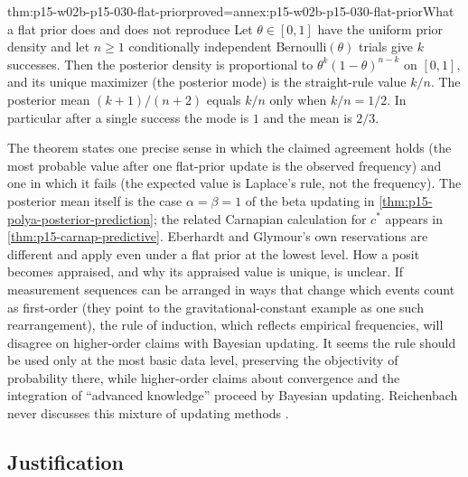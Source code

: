 \begin{hbtheorem}{thm:p15-w02b-p15-030-flat-prior}{proved=annex:p15-w02b-p15-030-flat-prior}{What a flat prior does and does not reproduce}
Let \(\theta\in[0,1]\) have the uniform prior density and let \(n\geq1\)
conditionally independent Bernoulli\((\theta)\) trials give \(k\)
successes. Then the posterior density is proportional to
\(\theta^k(1-\theta)^{n-k}\) on \([0,1]\), and its unique maximizer (the
posterior mode) is the straight-rule value \(k/n\). The posterior mean
\((k+1)/(n+2)\) equals \(k/n\) only when \(k/n=1/2\). In particular after
a single success the mode is \(1\) and the mean is \(2/3\).
\end{hbtheorem}

The theorem states one precise sense in which the claimed agreement
holds (the most probable value after one flat-prior update is the
observed frequency) and one in which it fails (the expected value is
Laplace's rule, not the frequency). The posterior mean itself is the case
\(\alpha=\beta=1\) of the beta updating in
\cref{thm:p15-polya-posterior-prediction}; the related Carnapian
calculation for \(c^*\) appears in \cref{thm:p15-carnap-predictive}. Eberhardt and Glymour's
own reservations are different and apply even under a flat prior at the
lowest level. How a posit becomes appraised, and why its appraised value
is unique, is unclear. If measurement sequences can be arranged in ways
that change which events count as first-order (they point to the
gravitational-constant example as one such rearrangement), the rule of
induction, which reflects empirical frequencies, will disagree on
higher-order claims with Bayesian updating. It seems the rule should be
used only at the most basic data level, preserving the objectivity of
probability there, while higher-order claims about convergence and the
integration of ``advanced knowledge'' proceed by Bayesian updating.
Reichenbach never discusses this mixture of updating methods
\cite[p.~374 and n.~11]{EberhardtGlymour2011ReichenbachReading}.

\subsection{Justification}
\label{sec:p15-w02b-p15-030-eg-justification}

